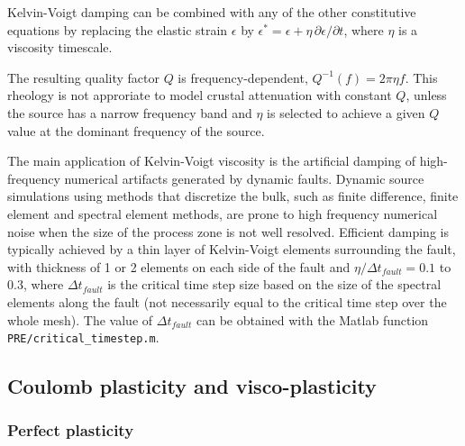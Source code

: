 Kelvin-Voigt damping can be combined with any of the other constitutive equations
by replacing the elastic strain $\epsilon$ by $\epsilon^* = \epsilon + \eta\,\partial\epsilon/\partial t$,
where $\eta$ is a viscosity timescale.

The resulting quality factor $Q$ is frequency-dependent, $Q^{-1}(f) = 2\pi\eta f$.
This rheology is not approriate to model crustal attenuation with constant $Q$, 
unless the source has a narrow frequency band
and $\eta$ is selected to achieve a given $Q$ value at the dominant frequency of the source.

The main application of Kelvin-Voigt viscosity is the artificial damping of high-frequency
numerical artifacts generated by dynamic faults.
Dynamic source simulations using methods that discretize the bulk, such as
finite difference, finite element and spectral
element methods, are prone to high frequency numerical noise 
when the size of the process zone is not well resolved.
Efficient damping is typically achieved
by a thin layer of Kelvin-Voigt elements surrounding the fault,
with thickness of 1 or 2 elements on each side of the fault
and $\eta/\Delta t_{fault} = 0.1$ to $0.3$, where $\Delta t_{fault}$ 
is the critical time step size based on the size of the spectral elements along the fault
(not necessarily equal to the critical time step over the whole mesh).
The value of $\Delta t_{fault}$ can be obtained with 
the Matlab function \texttt{PRE/critical\_timestep.m}.


\subsection{Coulomb plasticity and visco-plasticity}

\subsubsection{Perfect plasticity}

